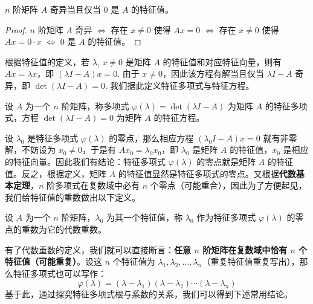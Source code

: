 \begin{theorem}
$n$ 阶矩阵 $A$ 奇异当且仅当 $0$ 是 $A$ 的特征值。
\end{theorem}
\begin{proof}
$n$ 阶矩阵 $A$ 奇异 $\iff$ 存在 $x\neq0$ 使得 $Ax=0$ $\iff$ 存在 $x\neq0$ 使得 $Ax=0\cdot x$ $\iff$ $0$ 是 $A$ 的特征值。
\end{proof}

根据特征值的定义，若 $\lambda,\,x\neq0$ 是矩阵 $A$ 的特征值和对应特征向量，则有 $Ax=\lambda x$，即 $(\lambda I-A)x=0$. 由于 $x\neq 0$，因此该方程有解当且仅当 $\lambda I-A$ 奇异，即 $\det(\lambda I-A)=0$. 我们据此定义特征多项式与特征方程。

\begin{definition}
设 $A$ 为一个 $n$ 阶矩阵，称多项式 $\varphi(\lambda)=\det(\lambda I-A)$ 为矩阵 $A$ 的特征多项式，方程 $\det(\lambda I-A)=0$ 为矩阵 $A$ 的特征方程。
\end{definition}

设 $\lambda_0$ 是特征多项式 $\varphi(\lambda)$ 的零点，那么相应方程 $(\lambda_0I-A)x=0$ 就有非零解，不妨设为 $x_0\neq0$，于是有 $Ax_0=\lambda_0x_0$，即 $\lambda_0$ 是矩阵 $A$ 的特征值，$x_0$ 是相应的特征向量。因此我们有结论：特征多项式 $\varphi(\lambda)$ 的零点就是矩阵 $A$ 的特征值。反之，根据定义，矩阵 $A$ 的特征值显然是特征多项式的零点。又根据\textbf{代数基本定理}，$n$ 阶多项式在复数域中必有 $n$ 个零点（可能重合），因此为了方便起见，我们给特征值的重数做出以下定义。

\begin{definition}[代数重数]
设 $A$ 为一个 $n$ 阶矩阵，$\lambda_0$ 为其一个特征值，称 $\lambda_0$ 作为特征多项式 $\varphi(\lambda)$ 的零点的重数为它的代数重数。
\end{definition}

有了代数重数的定义，我们就可以直接断言：\textbf{任意 $n$ 阶矩阵在复数域中恰有 $n$ 个特征值（可能重复）}。设这 $n$ 个特征值为 $\lambda_1,\lambda_2,\ldots,\lambda_n$（重复特征值重复写出），那么特征多项式也可以写作：
\[
    \varphi(\lambda)=(\lambda-\lambda_1)(\lambda-\lambda_2)\cdots(\lambda-\lambda_n)
\]
基于此，通过探究特征多项式根与系数的关系，我们可以得到下述常用结论。

